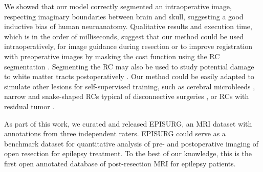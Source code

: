 We showed that our model correctly segmented an intraoperative image, respecting imaginary boundaries between brain and skull, suggesting a good inductive bias of human neuroanatomy.
Qualitative results and execution time, which is in the order of milliseconds, suggest that our method could be used intraoperatively, for image guidance during resection or to improve registration with preoperative images by masking the cost function using the \ac{RC} segmentation \cite{brett_spatial_2001}.
Segmenting the \ac{RC} may also be used to study potential damage to white matter tracts postoperatively \cite{winston_optic_2012}.
Our method could be easily adapted to simulate other lesions for self-supervised training, such as cerebral microbleeds \cite{cuadrado-godia_cerebral_2018}, narrow and snake-shaped \acp{RC} typical of disconnective surgeries \cite{mohamed_temporoparietooccipital_2011}, or \acp{RC} with residual tumor \cite{meier_automatic_2017}.

As part of this work, we curated and released EPISURG, an \ac{MRI} dataset with annotations from three independent raters.
EPISURG could serve as a benchmark dataset for quantitative analysis of pre- and postoperative imaging of open resection for epilepsy treatment.
To the best of our knowledge, this is the first open annotated database of post-resection \ac{MRI} for epilepsy patients.
